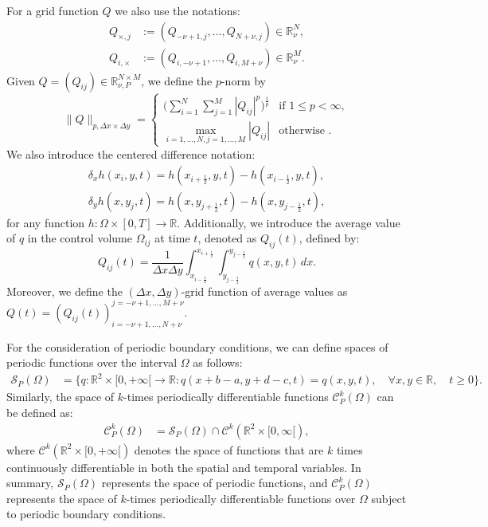For a grid function $Q$ we also use the notations:
\begin{align*}
Q_{\times,j} &:= (Q_{-\nu+1,j}, \ldots, Q_{N+\nu,j}) \in \mathbb{R}^N_{\nu},\\
Q_{i,\times} &:= (Q_{i,-\nu+1}, \ldots, Q_{i,M+\nu}) \in \mathbb{R}^M_{\nu}.
\end{align*}
Given $Q = (Q_{ij})\in \mathbb{R}^{N \times M}_{\nu, P}$, we define the $p$-norm by
\begin{equation}
	\label{chp3-pnorm}
	\|Q\|_{p,\Delta x \times \Delta y}=
	\begin{cases}
		\bigg( \sum_{i=1}^{N} \sum_{j=1}^{M}|Q_{ij}|^p \bigg)^{\frac{1}{p}} & \text{if } 1\leq p < \infty,\\
		\max_{i=1, \ldots, N,j=1,\ldots,M}{|Q_{ij}|} & \text{otherwise }.
	\end{cases}
\end{equation}
We also introduce the centered difference notation:
\begin{align}
	\label{sec-adv2d:eq6}
	\delta_x {h}(x_i,y, t) = 
	{h}(x_{i+\frac{1}{2}}, y, t) - 
	{h}(x_{i-\frac{1}{2}}, y, t), \\
	\delta_y {h}(x, y_j,t) = 
    {h}(x, y_{j+\frac{1}{2}},t) - 
    {h}(x, y_{j-\frac{1}{2}},t),
\end{align}
for any function $h: \Omega \times [0,T] \to \mathbb{R}$.
Additionally, we introduce the average value of $q$ in the control volume
$\Omega_{ij}$ at time $t$, denoted as ${Q}_{ij}(t)$, defined by:
\begin{equation}
	\label{chp3-sec1-not2}
	{Q}_{ij}(t) = \frac{1}{\Delta x \Delta y}
	\int_{x_{i-\frac{1}{2}}}^{x_{i+\frac{1}{2}}} \int_{y_{j-\frac{1}{2}}}^{y_{j-\frac{1}{2}}} {q}(x,y,t) \,dx.
\end{equation}
Moreover, we define the $(\Delta x, \Delta y)$-grid function of average values as $Q(t) = (Q_{ij}(t))_{i=-\nu+1,\ldots,N+\nu}^{j=-\nu+1,\ldots,M+\nu}$.

For the consideration of periodic boundary conditions, we can define spaces of periodic functions over 
the interval $\Omega$ as follows:
\begin{align*}
	\mathcal{S}_P(\Omega) &= \{q:\mathbb{R}^2\times[0,+\infty[\to \mathbb{R}: q(x+b-a,y+d-c,t)=q(x,y,t), \quad \forall x,y \in \mathbb{R}, \quad t\geq0\}.
\end{align*}
Similarly, the space of $k$-times periodically differentiable functions $\mathcal{C}_P^k(\Omega)$ can be defined as:
\begin{align*}
	\mathcal{C}_P^k(\Omega) &= \mathcal{S}_P(\Omega) \cap \mathcal{C}^k(\mathbb{R}^2\times[0,\infty[),
\end{align*}
where $\mathcal{C}^k(\mathbb{R}^2\times[0,+\infty[)$ denotes the space of functions that are $k$ 
times continuously differentiable in both the spatial and temporal variables.
In summary, $\mathcal{S}_P(\Omega)$ represents the space of periodic functions, and $\mathcal{C}_P^k(\Omega)$
represents the space of $k$-times periodically differentiable functions over $\Omega$ subject to periodic boundary conditions.

